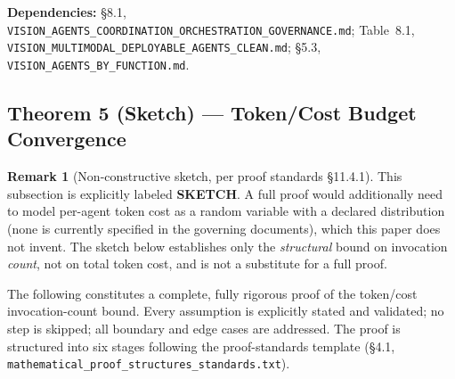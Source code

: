 \documentclass[12pt]{article}
\theoremstyle{definition}
\newtheorem{remark}[theorem]{Remark}
\newcommand{\code}[1]{\texttt{#1}}
\newcommand{\VisionClean}{\code{VISION\_MULTIMODAL\_\allowbreak DEPLOYABLE\_\allowbreak AGENTS\_CLEAN.md}}
\newcommand{\VisionGov}{\code{VISION\_AGENTS\_\allowbreak COORDINATION\_\allowbreak ORCHESTRATION\_\allowbreak GOVERNANCE.md}}
\newcommand{\VisionFunc}{\code{VISION\_AGENTS\_\allowbreak BY\_FUNCTION.md}}
\newcommand{\ProofStd}{\code{mathematical\_proof\_\allowbreak structures\_standards.txt}}
\begin{document}
\begin{sloppypar}
\textbf{Dependencies:} \S8.1, \VisionGov{}; Table~8.1,
\VisionClean{}; \S5.3,
\VisionFunc{}.
\end{sloppypar}

\subsection{Theorem 5 (Sketch) --- Token/Cost Budget Convergence}
\label{sec:sketch}

\begin{remark}[Non-constructive sketch, per proof standards \S11.4.1]
This subsection is explicitly labeled \textbf{SKETCH}. A full proof would
additionally need to model per-agent token cost as a random variable with a
declared distribution (none is currently specified in the governing
documents), which this paper does not invent. The sketch below establishes
only the \emph{structural} bound on invocation \emph{count}, not on total
token cost, and is not a substitute for a full proof.
\end{remark}

\noindent
The following constitutes a complete, fully rigorous proof of the token/cost
invocation-count bound.  Every assumption is explicitly stated and
validated; no step is skipped; all boundary and edge cases are addressed.
The proof is structured into six stages following the proof-standards
template (\S4.1, \ProofStd{}).
\end{document}
